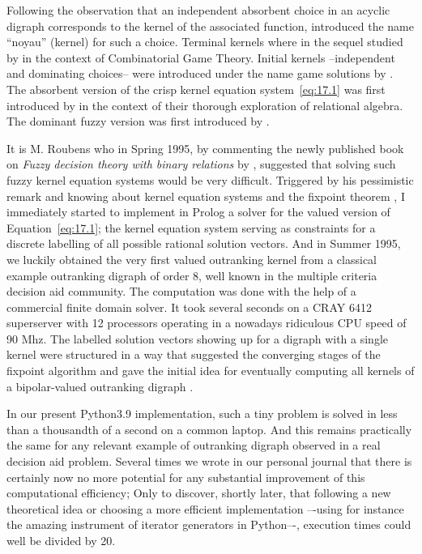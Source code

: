 Following the observation that an independent absorbent choice in an acyclic digraph corresponds to the kernel of the associated \Grundy function, \citet{RIG-1948} introduced the name ``noyau'' (kernel) for such a choice. Terminal kernels where in the sequel studied by \citet{BER-1958} in the context of Combinatorial Game Theory. Initial kernels --independent and dominating choices-- were introduced under the name game solutions by \citet{NEU-1944}. The absorbent version of the crisp kernel equation system~\vref{eq:17.1} was first introduced by \citet*{SCH-1985}  in the context of their thorough exploration of relational algebra. The dominant fuzzy version was first introduced by \citet{KIT-1993}.

It is M. Roubens who in Spring 1995, by commenting the newly published book on \emph{Fuzzy decision theory with binary relations} by \citet{KIT-1993}, suggested that solving such fuzzy kernel equation systems would be very difficult. Triggered by his pessimistic remark and knowing about kernel equation systems and the \Neumann fixpoint theorem \citep{NEU-1944,SCH-1985}, I immediately started to implement in Prolog a solver for the valued version of Equation~\vref{eq:17.1}; the kernel equation system serving as constraints for a discrete labelling of all possible rational solution vectors. And in Summer 1995, we luckily obtained the very first valued outranking kernel from a classical example outranking digraph of order 8, well known in the multiple criteria decision aid community. The computation was done with the help of a commercial finite domain solver. It took several seconds on a CRAY 6412 superserver with 12 processors operating in a nowadays ridiculous CPU speed of 90 Mhz. The labelled solution vectors showing up for a digraph with a single kernel were structured in a way that suggested the converging stages of the \Neumann fixpoint algorithm and gave the initial idea for eventually computing all kernels of a bipolar-valued outranking digraph \citep*{BIS-1996,BIS-1997,BIS-2004d}. 

In our present Python3.9 implementation, such a tiny problem is solved in less than a thousandth of a second on a common laptop. And this remains practically the same for any relevant example of outranking digraph observed in a real decision aid problem. Several times we wrote in our personal journal that there is certainly now no more potential for any substantial improvement of this computational efficiency; Only to discover, shortly later, that following a new theoretical idea or choosing a more efficient implementation –-using for instance the amazing instrument of iterator generators in Python–-, execution times could well be divided by 20.


